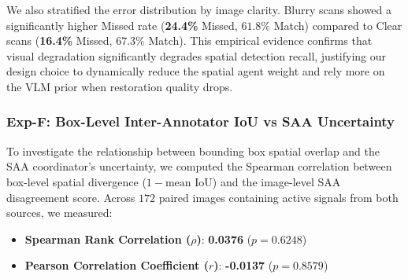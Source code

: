 \documentclass[12pt,onecolumn,a4paper]{IEEEtran}
\begin{document}
\begin{table}[!htbp]
\centering
\caption{Exp-E: Per-Class Spatial Error Taxonomy ($n=673$ Human Boxes).}
\label{tab:class_error_taxonomy}
\end{table}

We also stratified the error distribution by image clarity. Blurry scans showed a significantly higher Missed rate (\textbf{24.4\%} Missed, $61.8\%$ Match) compared to Clear scans (\textbf{16.4\%} Missed, $67.3\%$ Match). This empirical evidence confirms that visual degradation significantly degrades spatial detection recall, justifying our design choice to dynamically reduce the spatial agent weight and rely more on the VLM prior when restoration quality drops.

\subsubsection{Exp-F: Box-Level Inter-Annotator IoU vs SAA Uncertainty}
To investigate the relationship between bounding box spatial overlap and the SAA coordinator's uncertainty, we computed the Spearman correlation between box-level spatial divergence ($1 - \text{mean IoU}$) and the image-level SAA disagreement score. Across $172$ paired images containing active signals from both sources, we measured:
\begin{itemize}
    \item \textbf{Spearman Rank Correlation ($\rho$)}: \textbf{0.0376} ($p = 0.6248$)
    \item \textbf{Pearson Correlation Coefficient ($r$)}: \textbf{-0.0137} ($p = 0.8579$)
\end{itemize}
\end{document}
